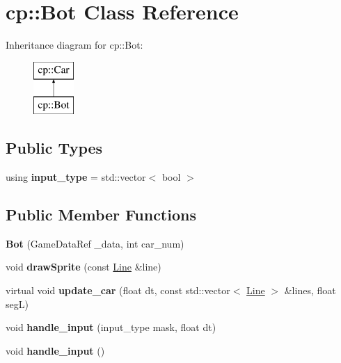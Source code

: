 \hypertarget{classcp_1_1_bot}{}\section{cp\+:\+:Bot Class Reference}
\label{classcp_1_1_bot}
Inheritance diagram for cp\+:\+:Bot\+:\begin{figure}[H]
\begin{center}
\leavevmode
\includegraphics[height=2.000000cm]{classcp_1_1_bot}
\end{center}
\end{figure}
\subsection*{Public Types}
\begin{DoxyCompactItemize}
\item 
\mbox{\label{classcp_1_1_bot_a0e9a97565604df18c5ea15e95cb626d9}} 
using {\bfseries input\+\_\+type} = std\+::vector$<$ bool $>$
\end{DoxyCompactItemize}
\subsection*{Public Member Functions}
\begin{DoxyCompactItemize}
\item 
\mbox{\label{classcp_1_1_bot_a206a47f38ff4d5ecacb085d669484c05}} 
{\bfseries Bot} (Game\+Data\+Ref \+\_\+data, int car\+\_\+num)
\item 
\mbox{\label{classcp_1_1_bot_ae7218bd53d6ba9d1df22a45be4d353d5}} 
void {\bfseries draw\+Sprite} (const \hyperlink{classcp_1_1_line}{Line} \&line)
\item 
\mbox{\label{classcp_1_1_bot_aca81cf6805f57022a5182664d6eedb3e}} 
virtual void {\bfseries update\+\_\+car} (float dt, const std\+::vector$<$ \hyperlink{classcp_1_1_line}{Line} $>$ \&lines, float segL)
\item 
\mbox{\label{classcp_1_1_bot_ab0b5d1af659659a34ad01ead5c183bbe}} 
void {\bfseries handle\+\_\+input} (input\+\_\+type mask, float dt)
\item 
\mbox{\label{classcp_1_1_bot_afae88cef6bf398d58e1743188fa43837}} 
void {\bfseries handle\+\_\+input} ()
\end{DoxyCompactItemize}
